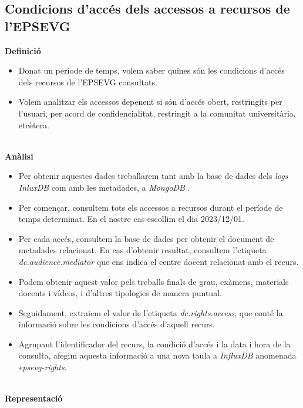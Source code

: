 \clearpage

\subsection{Condicions d'accés dels accessos a recursos de l'EPSEVG}\label{subsec:acces-conditions}

\textbf{Definició}

\begin{itemize}
    \item Donat un període de temps, volem saber quines són les condicions d'accés dels recursos de l'EPSEVG consultats.
    \item Volem analitzar els accessos depenent si són d'accés obert, restringits per l'usuari, per acord de confidencialitat, restringit a la comunitat universitària, etcètera.
\end{itemize}

\noindent \\
\textbf{Anàlisi}

\begin{itemize}
    \item Per obtenir aquestes dades treballarem tant amb la base de dades dels \textit{\gls{log}s} \textit{InluxDB} com amb les metadades, a \textit{MongoDB} .
    \item Per començar, consultem tots els accessos a recursos durant el període de temps determinat.
    En el nostre cas escollim el dia 2023/12/01.
    \item Per cada accés, consultem la base de dades per obtenir el document de metadades relacionat.
    En cas d'obtenir resultat, consultem l'etiqueta \textit{dc.audience.mediator} que ens indica el centre docent relacionat amb el recurs.
    \item Podem obtenir aquest valor pels treballs finals de grau, exàmens, materials docents i vídeos, i d'altres tipologies de manera puntual.
    \item Seguidament, extraiem el valor de l'etiqueta \textit{dc.rights.access}, que conté la informació sobre les condicions d'accés d'aquell recurs.
    \item Agrupant l'identificador del recurs, la condició d'accés i la data i hora de la consulta, afegim aquesta informació a una nova taula a \textit{InfluxDB} anomenada \textit{epsevg-rights}.

\end{itemize}

\clearpage

\noindent \\
\textbf{Representació}


